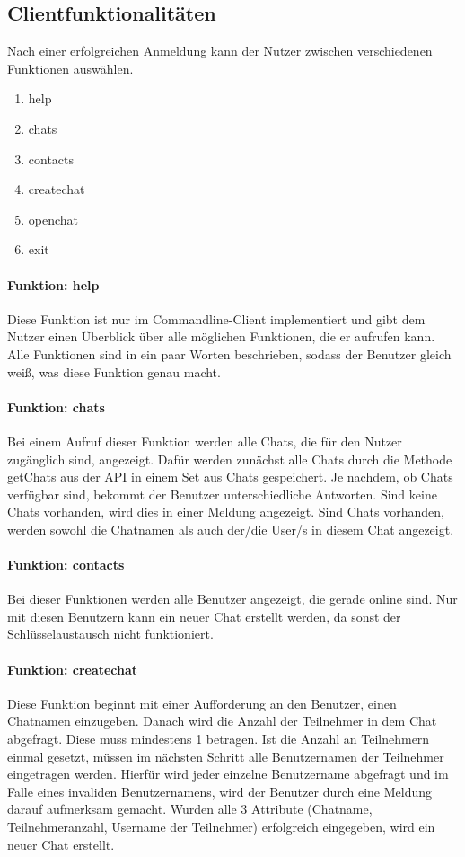 \author{Jan Grübener, Troy Keßler, Patrick Mischka, Michael Angermeier}
\subsection{Clientfunktionalitäten}
Nach einer erfolgreichen Anmeldung kann der Nutzer zwischen verschiedenen Funktionen auswählen.
\begin{enumerate}
    \item help
    \item chats
    \item contacts
    \item createchat
    \item openchat
    \item exit
\end{enumerate}
\paragraph{Funktion: help}
Diese Funktion ist nur im Commandline-Client implementiert und gibt dem Nutzer einen Überblick
über alle möglichen Funktionen, die er aufrufen kann. Alle Funktionen sind in ein paar Worten beschrieben,
sodass der Benutzer gleich weiß, was diese Funktion genau macht.
\paragraph{Funktion: chats}
Bei einem Aufruf dieser Funktion werden alle Chats, die für den Nutzer zugänglich sind, angezeigt.
Dafür werden zunächst alle Chats durch die Methode getChats aus der API in einem Set aus Chats gespeichert.
Je nachdem, ob Chats verfügbar sind, bekommt der Benutzer unterschiedliche Antworten.
Sind keine Chats vorhanden, wird dies in einer Meldung angezeigt.
Sind Chats vorhanden, werden sowohl die Chatnamen als auch der/die User/s in diesem Chat angezeigt.
\paragraph{Funktion: contacts}
Bei dieser Funktionen werden alle Benutzer angezeigt, die gerade online sind. Nur mit diesen Benutzern kann ein neuer
Chat erstellt werden, da sonst der Schlüsselaustausch nicht funktioniert.
\paragraph{Funktion: createchat}
Diese Funktion beginnt mit einer Aufforderung an den Benutzer, einen Chatnamen einzugeben.
Danach wird die Anzahl der Teilnehmer in dem Chat abgefragt. Diese muss mindestens 1 betragen.
Ist die Anzahl an Teilnehmern einmal gesetzt, müssen im nächsten Schritt alle Benutzernamen
der Teilnehmer eingetragen werden. Hierfür wird jeder einzelne Benutzername abgefragt und
im Falle eines invaliden Benutzernamens, wird der Benutzer durch eine Meldung darauf aufmerksam gemacht.
Wurden alle 3 Attribute (Chatname, Teilnehmeranzahl, Username der Teilnehmer) erfolgreich eingegeben,
wird ein neuer Chat erstellt.
